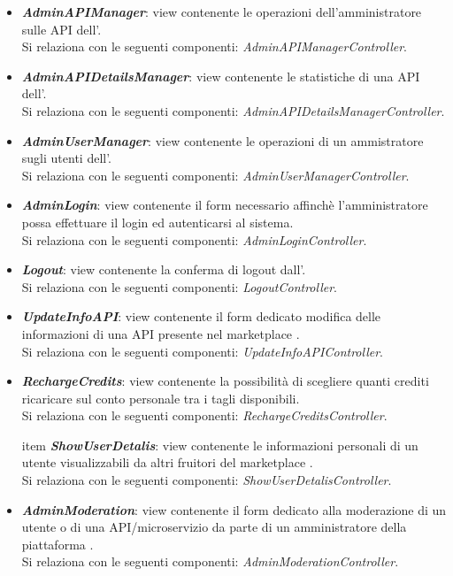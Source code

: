 \begin{itemize}
\begin{itemize}
		\item \textbf{\textit{AdminAPIManager}}: view contenente le operazioni dell'amministratore sulle API dell'\progetto.\\
		Si relaziona con le seguenti componenti: \textit{AdminAPIManagerController}.
		
		\item \textbf{\textit{AdminAPIDetailsManager}}: view contenente le statistiche di una API dell'\progetto.\\
		Si relaziona con le seguenti componenti: \textit{AdminAPIDetailsManagerController}.
		
		\item \textbf{\textit{AdminUserManager}}: view contenente le operazioni di un ammistratore sugli utenti dell'\progetto.\\
		Si relaziona con le seguenti componenti: \textit{AdminUserManagerController}.
		
		\item \textbf{\textit{AdminLogin}}: view contenente il form necessario affinchè l'amministratore possa effettuare il login ed autenticarsi al sistema.\\
		Si relaziona con le seguenti componenti: \textit{AdminLoginController}.
		
		\item \textbf{\textit{Logout}}: view contenente la conferma di logout dall'\progetto.\\
		Si relaziona con le seguenti componenti: \textit{LogoutController}.
		
		\item \textbf{\textit{UpdateInfoAPI}}: view contenente il form dedicato modifica delle informazioni di una API presente nel marketplace \progetto.\\
		Si relaziona con le seguenti componenti: \textit{UpdateInfoAPIController}.
		
		\item \textbf{\textit{RechargeCredits}}: view contenente la possibilità di scegliere quanti crediti ricaricare sul conto personale tra i tagli disponibili.\\
		Si relaziona con le seguenti componenti: \textit{RechargeCreditsController}.
		
		item \textbf{\textit{ShowUserDetalis}}: view contenente le informazioni personali di un utente visualizzabili da altri fruitori del marketplace \progetto.\\
		Si relaziona con le seguenti componenti: \textit{ShowUserDetalisController}.
		
		\item \textbf{\textit{AdminModeration}}: view contenente il form dedicato alla moderazione di un utente o di una API/microservizio da parte di un amministratore della piattaforma \progetto.\\
		Si relaziona con le seguenti componenti: \textit{AdminModerationController}.
	\end{itemize}
\end{itemize}

